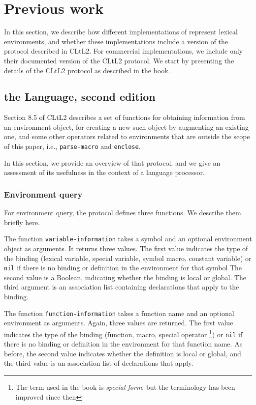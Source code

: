 \section{Previous work}

In this section, we describe how different implementations of
\commonlisp{} represent lexical environments, and whether these
implementations include a version of the protocol described in CLtL2.
For commercial implementations, we include only their documented
version of the CLtL2 protocol.  We start by presenting the details of
the CLtL2 protocol as described in the book.

\subsection{\commonlisp{} the Language, second edition}

Section 8.5 of CLtL2 describes a set of functions for obtaining
information from an environment object, for creating a new such object
by augmenting an existing one, and some other operators related to
environments that are outside the scope of this paper, i.e.,
\texttt{parse-macro} and \texttt{enclose}.

In this section, we provide an overview of that protocol, and we give
an assessment of its usefulness in the context of a language processor.

\subsubsection{Environment query}

For environment query, the protocol defines three functions.  We
describe them briefly here.

The function \texttt{variable-information} takes a symbol and an
optional environment object as arguments.  It returns three values.
The first value indicates the type of the binding (lexical variable,
special variable, symbol macro, constant variable) or \texttt{nil} if
there is no binding or definition in the environment for that symbol
The second value is a Boolean, indicating whether the binding is local
or global.  The third argument is an association list containing
declarations that apply to the binding.

The function \texttt{function-information} takes a function name and
an optional environment as arguments.  Again, three values are
returned.  The first value indicates the type of the binding
(function, macro, special operator%
\footnote{The term used in the book is \emph{special form}, but the
  terminology has been improved since then}) or \texttt{nil} if there
is no binding or definition in the environment for that function name.
As before, the second value indicates whether the definition is local
or global, and the third value is an association list of declarations
that apply.

